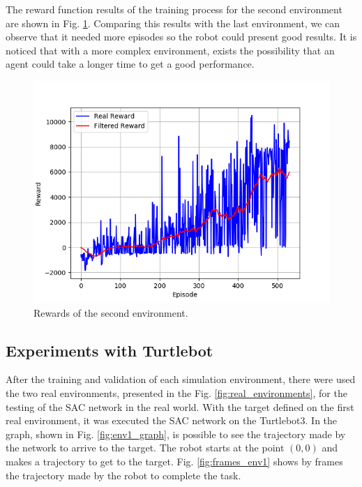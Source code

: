 The reward function results of the training process for the second environment are shown in Fig. \ref{fig:stage_2}.
Comparing this results with the last environment, we can observe that it needed more episodes so the robot could present good results.
It is noticed that with a more complex environment, exists the possibility that an agent could take a longer time to get a good performance.

\begin{figure}[htbp]
\centerline{\includegraphics[width=\columnwidth]{images/stage_2.png}}
\caption{Rewards of the second environment.}
\label{fig:stage_2}
\end{figure}

\subsection{Experiments with Turtlebot}

After the training and validation of each simulation environment, there were used the two real environments, presented in the Fig. \ref{fig:real_environments}, for the testing of the SAC network in the real world.
With the target defined on the first real environment, it was executed the SAC network on the Turtlebot3.
In the graph, shown in Fig. \ref{fig:env1_graph}, is possible to see the trajectory made by the network to arrive to the target.
The robot starts at the point $(0, 0)$ and makes a trajectory to get to the target.
Fig. \ref{fig:frames_env1} shows by frames the trajectory made by the robot to complete the task.

